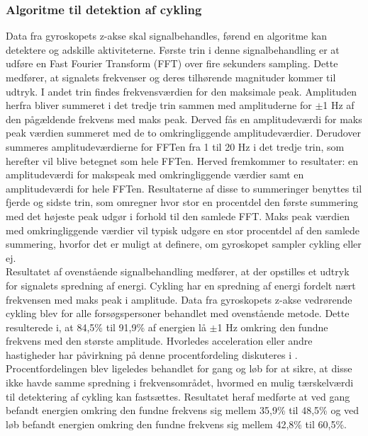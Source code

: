 \subsubsection{Algoritme til detektion af cykling}
Data fra gyroskopets z-akse skal signalbehandles, førend en algoritme kan detektere og adskille aktiviteterne. Første trin i denne signalbehandling er at udføre en Fast Fourier Transform (FFT) over fire sekunders sampling. Dette medfører, at signalets frekvenser og deres tilhørende magnituder kommer til udtryk. I andet trin findes frekvensværdien for den maksimale peak. Amplituden herfra bliver summeret i det tredje trin sammen med amplituderne for $\pm$1 Hz af den pågældende frekvens med maks peak. Derved fås en amplitudeværdi for maks peak værdien summeret med de to omkringliggende amplitudeværdier. Derudover %
summeres amplitudeværdierne for FFTen fra 1 til 20 Hz i det tredje trin, som herefter vil blive betegnet som hele FFTen.
Herved fremkommer to resultater: en amplitudeværdi for makspeak med omkringliggende værdier samt en amplitudeværdi for hele FFTen. Resultaterne af disse to summeringer benyttes til fjerde og sidste trin, som omregner hvor stor en procentdel den første summering med det højeste peak udgør i forhold til den samlede FFT. Maks peak værdien med omkringliggende værdier vil typisk udgøre en stor procentdel af den samlede summering, hvorfor det er muligt at definere, om gyroskopet sampler cykling eller ej.\\
Resultatet af ovenstående signalbehandling medfører, at der opstilles et udtryk for signalets spredning af energi. Cykling har en spredning af energi fordelt nært frekvensen med maks peak i amplitude. Data fra gyroskopets z-akse vedrørende cykling blev for alle forsøgspersoner behandlet med ovenstående metode. Dette resulterede i, at 84,5\% til 91,9\% af energien lå $\pm$1 Hz omkring den fundne frekvens med den største amplitude. Hvorledes acceleration eller andre hastigheder har påvirkning på denne procentfordeling diskuteres i . Procentfordelingen blev ligeledes behandlet for gang og løb for at sikre, at disse ikke havde samme spredning i frekvensområdet, hvormed en mulig tærskelværdi til detektering af cykling kan fastsættes. Resultatet heraf medførte at ved gang befandt energien omkring den fundne frekvens sig mellem 35,9\% til 48,5\% og ved løb befandt energien omkring den fundne frekvens sig mellem 42,8\% til 60,5\%. \\
